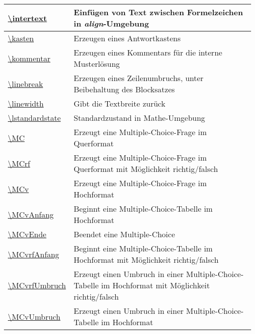 \documentclass[./main.tex]{subfiles}
\begin{document}
\begin{tabularx}{\linewidth}{|l|X|}
    \hyperlink{intertext}{\textbackslash{}intertext}&Einf\"ugen von Text zwischen Formelzeichen in \textit{align}-Umgebung\\\hline
    \hyperlink{kasten}{\textbackslash{}kasten}&Erzeugen eines Antwortkastens\\\hline
    \hyperlink{kommentar}{\textbackslash{}kommentar}&Erzeugen eines Kommentars f\"ur die interne Musterl\"osung\\\hline
    \hyperlink{linebreak}{\textbackslash{}linebreak}&Erzeugen eines Zeilenumbruchs, unter Beibehaltung des Blocksatzes\\\hline
    \hyperlink{linewidth}{\textbackslash{}linewidth}&Gibt die Textbreite zur\"uck\\\hline
    \hyperlink{lstandardstate}{\textbackslash{}lstandardstate}&Standardzustand in Mathe-Umgebung\\\hline
    \hyperlink{MC}{\textbackslash{}MC}&Erzeugt eine Multiple-Choice-Frage im Querformat\\\hline
    \hyperlink{MCrf}{\textbackslash{}MCrf}&Erzeugt eine Multiple-Choice-Frage im Querformat mit M\"oglichkeit richtig/falsch\\\hline
    \hyperlink{MCv}{\textbackslash{}MCv}&Erzeugt eine Multiple-Choice-Frage im Hochformat\\\hline
    \hyperlink{MCvAnfang}{\textbackslash{}MCvAnfang}&Beginnt eine Multiple-Choice-Tabelle im Hochformat\\\hline
    \hyperlink{MCvEnde}{\textbackslash{}MCvEnde}&Beendet eine Multiple-Choice\\\hline
    \hyperlink{MCvrfAnfang}{\textbackslash{}MCvrfAnfang}&Beginnt eine Multiple-Choice-Tabelle im Hochformat mit M\"oglichkeit richtig/falsch\\\hline
    \hyperlink{MCvrfUmbruch}{\textbackslash{}MCvrfUmbruch}&Erzeugt einen Umbruch in einer Multiple-Choice-Tabelle im Hochformat mit M\"oglichkeit richtig/falsch\\\hline
    \hyperlink{MCvUmbruch}{\textbackslash{}MCvUmbruch}&Erzeugt einen Umbruch in einer Multiple-Choice-Tabelle im Hochformat\\\hline

\end{tabularx}
\end{document}
